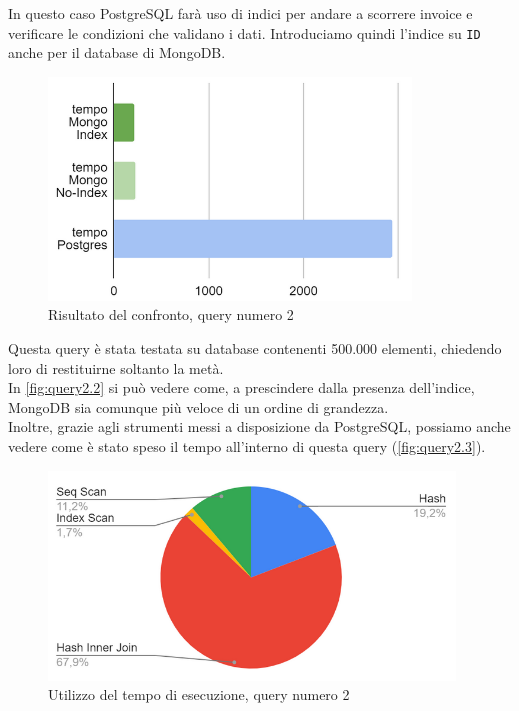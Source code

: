 \noindent In questo caso PostgreSQL farà uso di indici per andare a scorrere invoice e verificare le condizioni che validano i dati. Introduciamo quindi l'indice su \texttt{ID} anche per il database di MongoDB.\\

\begin{figure}[htbp]
\begin{center}
\includegraphics[height=16em]{immagini/query/query2_results1.png}
\caption{Risultato del confronto, query numero 2}
\label{fig:query2.2}
\end{center}
\end{figure}

\noindent Questa query è stata testata su database contenenti 500.000 elementi, chiedendo loro di restituirne soltanto la metà.\\
In \autoref{fig:query2.2} si può vedere come, a prescindere dalla presenza dell'indice, MongoDB sia comunque più veloce di un ordine di grandezza.\\
Inoltre, grazie agli strumenti messi a disposizione da PostgreSQL, possiamo anche vedere come è stato speso il tempo all'interno di questa query (\autoref{fig:query2.3}).

\begin{figure}[htbp]
\begin{center}
\includegraphics[height=15em]{immagini/query/query2_results2.png}
\caption{Utilizzo del tempo di esecuzione, query numero 2}
\label{fig:query2.3}
\end{center}
\end{figure}

